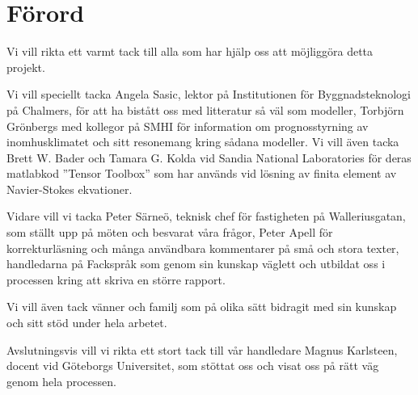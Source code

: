 \chapter*{Förord}


Vi vill rikta ett varmt tack till alla som har hjälp oss att möjliggöra detta projekt. 

Vi vill speciellt tacka Angela Sasic, lektor på Institutionen för Byggnadsteknologi på Chalmers, för att ha bistått oss med litteratur så väl som modeller, Torbjörn Grönbergs med kollegor på SMHI för information om prognosstyrning av inomhusklimatet och sitt resonemang kring sådana modeller. Vi vill även tacka Brett W. Bader och Tamara G. Kolda vid Sandia National Laboratories för deras matlabkod ''Tensor Toolbox'' som har används vid lösning av finita element av Navier-Stokes ekvationer.

Vidare vill vi tacka Peter Särneö, teknisk chef för fastigheten på Walleriusgatan, som ställt upp på möten och besvarat våra frågor, Peter Apell för korrekturläsning och många användbara kommentarer på små och stora texter, handledarna på Fackspråk som genom sin kunskap väglett och utbildat oss i processen kring att skriva en större rapport.

Vi vill även tack vänner och familj som på olika sätt bidragit med sin kunskap och sitt stöd under hela arbetet.

Avslutningsvis vill vi rikta ett stort tack till vår handledare Magnus Karlsteen, docent vid Göteborgs Universitet, som stöttat oss och visat oss på rätt väg genom hela processen.

